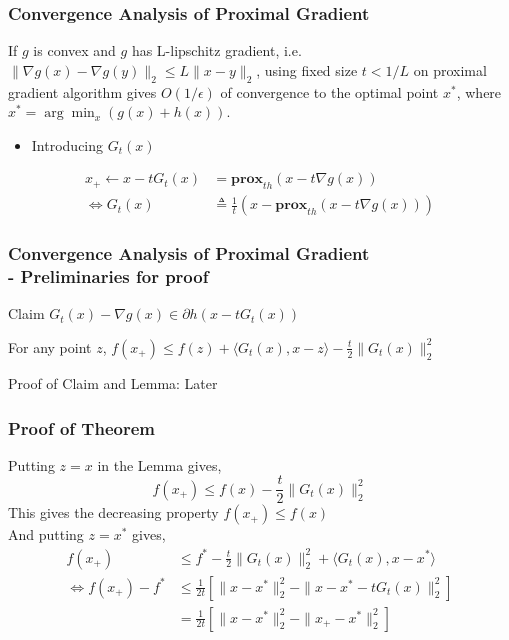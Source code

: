 \documentclass{beamer}
\begin{document}
\begin{frame}
\frametitle{Convergence Analysis of Proximal Gradient}
\begin{theorem}\label{16thm:convergence}
If $g$ is convex and $g$ has L-lipschitz gradient, i.e. $\| \nabla g(x) - \nabla g(y)\|_2 \leq L\|x-y\|_2$, using fixed size $t < 1/L$ on proximal gradient algorithm gives $O(1/\epsilon)$ of convergence to the optimal point $x^*$, where $x^* = \arg\min_x \left( g(x) + h(x)\right)$.
\end{theorem}
\begin{itemize}
\item Introducing $G_t(x)$
\end{itemize}
\vspace{-1em}
\begin{align*}
x_+ \leftarrow x-t G_t (x)&=\textbf{prox}_{th}(x-t\nabla g(x))\\
\Leftrightarrow G_t (x) &\triangleq \frac{1}{t}\left( x - \textbf{prox}_{th}(x-t\nabla g(x)) \right)
\end{align*}
\end{frame}

\begin{frame}
\frametitle{Convergence Analysis of Proximal Gradient\\- Preliminaries for proof}
\begin{block}{Claim}
$G_t (x)- \nabla g(x) \in \partial h(x-tG_t (x))$
\end{block}
\begin{lemma}
\label{16lemma:quadratic} 
For any point $z$, $f(x_+)\leq f(z)+ \langle G_t (x),x-z \rangle -\frac{t}{2}\|G_t (x)\|_2^2 $
\end{lemma}
Proof of Claim and Lemma: Later

\end{frame}

\begin{frame}
\frametitle{Proof of Theorem}
Putting $z=x$ in the Lemma gives,
\begin{equation*}
f(x_+) \leq f(x)-\frac{t}{2}\|G_t (x)\|_2^2
\end{equation*}
This gives the decreasing property $f(x_+) \leq f(x)$\\
And putting $z=x^*$ gives,
\begin{align*}
f(x_+) &\leq f^*-\frac{t}{2}\|G_t (x)\|_2^2+\langle G_t (x),x-x^* \rangle\\
\Leftrightarrow f(x_+)-f^* &\leq \frac{1}{2t}\left[ \|x-x^* \|_2^2 - \|x-x^*-tG_t(x)\|_2^2 \right]\\
&=\frac{1}{2t}\left[ \|x-x^* \|_2^2 - \|x_+ -x^*\|_2^2 \right]
\end{align*}


\end{frame}
\end{document}
